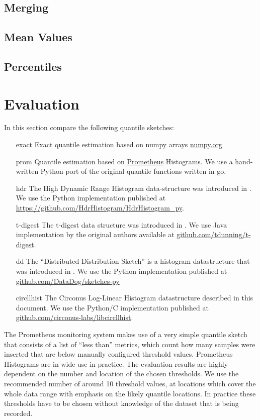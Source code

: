 \documentclass{article}
\theoremstyle{plain}
\theoremstyle{remark}
\begin{document}
\subsection{Merging}

\subsection{Mean Values}

\subsection{Percentiles}

\section{Evaluation}

In this section compare the following quantile sketches:

\begin{itemize}
\item[exact]
  Exact quantile estimation based on numpy arrays \url{numpy.org}
\item[prom]
  Quantile estimation based on \href{prometheus.io}{Prometheus} Histograms.
  We use a hand-written Python port of the original quantile functions written in go.
\item[hdr]
  The High Dynamic Range Histogram data-structure was introduced in \cite{hdr}.
  We use the Python implementation published at \url{https://github.com/HdrHistogram/HdrHistogram_py}.
\item[t-digest]
  The t-digest data structure was introduced in \cite{tdigest}.
  We use Java implementation by the original authors available at \url{github.com/tdunning/t-digest}.
\item[dd]
  The ``Distributed Distribution Sketch'' is a histogram datastructure that was introduced in \cite{dd}.
  We use the Python implementation published at \url{github.com/DataDog/sketches-py}
\item[circllhist]
  The Circonus Log-Linear Histogram datastructure described in this document.
  We use the Python/C implementation published at \url{github.com/circonus-labs/libcircllhist}.
\end{itemize}

The Prometheus monitoring system makes use of a very simple quantile sketch that consists of a list
of ``less than'' metrics, which count how many samples were inserted that are below manually
configured threshold values.
Prometheus Histograms are in wide use in practice.
The evaluation results are highly dependent on the number and location of the chosen thresholds.
We use the recommended number of around 10 threshold values, at locations which cover the whole
data range with emphasis on the likely quantile locations.
In practice these thresholds have to be chosen without knowledge of the dataset that is being recorded.
\end{document}
